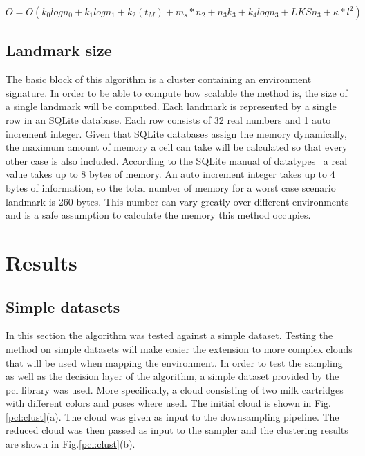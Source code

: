\documentclass[]{article}
\begin{document}
    \begin{equation} \label{Complexity}
        O= O(k_{0}logn_{0} + k_{1}logn_{1} + k_{2}(t_M)+ m_s*n_{2} + n_{3}k_{3} + k_{4}logn_{3} + LKSn_3 + \kappa * l^2)
    \end{equation}

    \subsection{Landmark size}

    The basic block of this algorithm is a cluster containing an environment signature. In order to be able to compute how scalable the method is, the size of a single landmark will be computed. Each landmark is represented by a single row in an SQLite database. Each row consists of 32 real numbers and 1 auto increment integer. Given that SQLite databases assign the memory dynamically, the maximum amount of memory a cell can take will be calculated so that every other case is also included. According to the SQLite manual of datatypes~\cite{sqlite} a real value takes up to 8 bytes of memory. An auto increment integer takes up to 4 bytes of information, so the total number  of memory for a worst case scenario landmark is 260 bytes. This number can vary greatly over different environments and is a safe assumption to calculate the memory this method occupies.

    \section{Results}
    \label{sec:results}

    \subsection{Simple datasets}

    In this section the algorithm was tested against a simple dataset. Testing the method on simple datasets will make easier the extension to more complex clouds that will be used when mapping the environment. In order to test the sampling as well as the decision layer of the algorithm, a simple dataset provided by the pcl\cite{pcl} library was used. More specifically, a cloud consisting of two milk cartridges with different colors and poses where used. The initial cloud is shown in Fig.\ref{pcl:clust}(a). The cloud was given as input to the downsampling pipeline. The reduced cloud was then passed as input to the sampler and the clustering results are shown in Fig.\ref{pcl:clust}(b).
\end{document}
